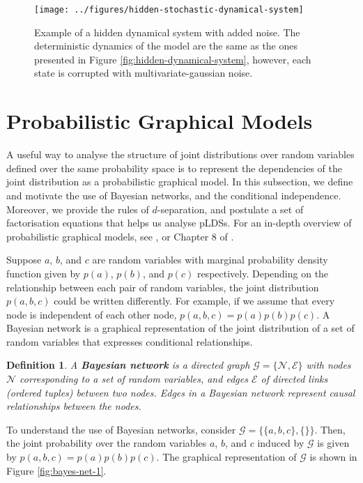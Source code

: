 \documentclass[12pt, oneside]{book}
\numberwithin{equation}{section}
\newtheorem{definition}{Definition}[section]
\begin{document}
{\begin{figure}[h!]
	\centering
	\texttt{[image: ../figures/hidden-stochastic-dynamical-system]}
	\caption{Example of a hidden dynamical system with added noise. The deterministic dynamics of the model are the same as the ones presented in Figure \ref{fig:hidden-dynamical-system}, however, each state is corrupted with multivariate-gaussian noise.}
	\label{fig:hidden-noisy-dynamical-system}
\end{figure}


\section{Probabilistic Graphical Models} \label{section:graphical-models}
A useful way to analyse the structure of joint distributions over random variables defined over the same probability space is to represent the dependencies of the joint distribution as a probabilistic graphical model. In this subsection, we define and motivate the use of Bayesian networks, and the conditional independence. Moreover, we provide the rules of $d$-separation, and postulate a set of factorisation equations that helps us analyse pLDSs. For an in-depth overview of probabilistic graphical models, see \cite{koller2009}, or Chapter 8 of \cite{prml}.

Suppose $a$, $b$, and $c$ are random variables with marginal probability density function given by $p(a)$, $p(b)$, and $p(c)$ respectively. Depending on the relationship between each pair of random variables, the joint distribution $p(a,b,c)$ could be written differently. For example, if we assume that every node is independent of each other node, $p(a,b,c) = p(a) p(b) p(c)$. A Bayesian network is a graphical representation of the joint distribution of a set of random variables that expresses conditional relationships.

\begin{definition}
	A \textbf{Bayesian network} is a directed graph $\mathcal G = \{\mathscr{N}, \mathscr{E}\}$ with nodes $\mathscr{N}$ corresponding to a set of random variables, and edges $\mathscr{E}$ of directed links (ordered tuples) between two nodes. Edges in a Bayesian network represent causal relationships between the nodes.
\end{definition}

To understand the use of Bayesian networks, consider $\mathcal G = \{\{a, b, c\}, \{\}\}$. Then, the joint probability over the random variables $a$, $b$, and $c$ induced by $\mathcal G$ is given by $p(a,b,c) = p(a) p(b) p(c)$. The graphical representation of $\mathcal G$ is shown in Figure \ref{fig:bayes-net-1}.

}
\end{document}
